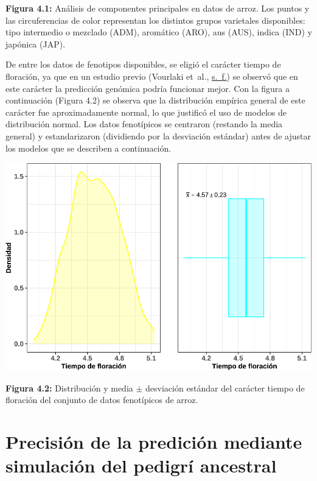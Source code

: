 \documentclass[11pt,spanish,a4paper,oneside,]{book} %
\begin{document}
\textbf{Figura 4.1:} Análisis de componentes principales en datos de arroz. Los puntos y las circuferencias de color representan los distintos grupos varietales disponibles: tipo intermedio o mezclado (ADM), aromático (ARO), aus (AUS), indica (IND) y japónica (JAP).

De entre los datos de fenotipos disponibles, se eligió el carácter tiempo de floración, ya que en un estudio previo (Vourlaki et~al., \protect\hyperlink{ref-cite:26}{s.~f.}) se observó que en este carácter la predicción genómica podría funcionar mejor. Con la figura a continuación (Figura 4.2) se observa que la distribución empírica general de este carácter fue aproximadamente normal, lo que justificó el uso de modelos de distribución normal. Los datos fenotípicos se centraron (restando la media general) y estandarizaron (dividiendo por la desviación estándar) antes de ajustar los modelos que se describen a continuación.

\begin{center}\includegraphics[width=1\linewidth]{figures/Graf_feno_2} \end{center}

\noindent
\textbf{Figura 4.2:} Distribución y media \(\pm\) desviación estándar del carácter tiempo de floración del conjunto de datos fenotípicos de arroz.

\hypertarget{precisiuxf3n-de-la-prediciuxf3n-mediante-simulaciuxf3n-del-pedigruxed-ancestral}{%
\section{Precisión de la predición mediante simulación del pedigrí ancestral}\label{precisiuxf3n-de-la-prediciuxf3n-mediante-simulaciuxf3n-del-pedigruxed-ancestral}}
\end{document}
